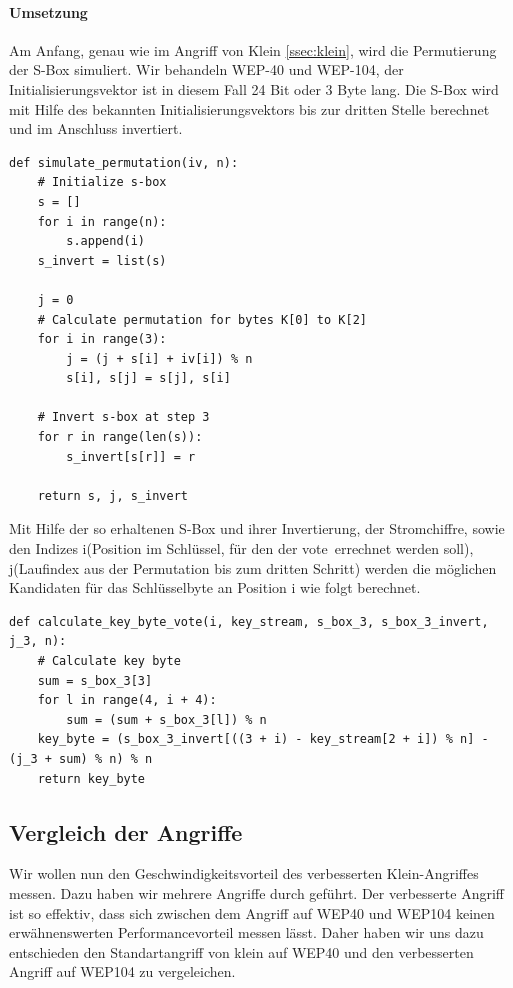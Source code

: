 \documentclass[10pt,a4paper]{article}
\begin{document}
\paragraph{Umsetzung}
Am Anfang, genau wie im Angriff von Klein \ref{ssec:klein}, wird die Permutierung der S-Box simuliert. Wir behandeln WEP-40 und WEP-104, der Initialisierungsvektor ist in diesem Fall 24 Bit oder 3 Byte lang. Die S-Box wird mit Hilfe des bekannten Initialisierungsvektors bis zur dritten Stelle berechnet und im Anschluss invertiert.
\begin{lstlisting}
def simulate_permutation(iv, n):
    # Initialize s-box
    s = []
    for i in range(n):
        s.append(i)
    s_invert = list(s)

    j = 0
    # Calculate permutation for bytes K[0] to K[2]
    for i in range(3):
        j = (j + s[i] + iv[i]) % n
        s[i], s[j] = s[j], s[i]

    # Invert s-box at step 3
    for r in range(len(s)):
        s_invert[s[r]] = r

    return s, j, s_invert
\end{lstlisting}
Mit Hilfe der so erhaltenen S-Box und ihrer Invertierung, der Stromchiffre, sowie den Indizes i(Position im Schlüssel, für den der \glqq vote\grqq\ errechnet werden soll), j(Laufindex aus der Permutation bis zum dritten Schritt) werden die möglichen Kandidaten für das Schlüsselbyte an Position i wie folgt berechnet.
\begin{lstlisting}
def calculate_key_byte_vote(i, key_stream, s_box_3, s_box_3_invert, j_3, n):
    # Calculate key byte
    sum = s_box_3[3]
    for l in range(4, i + 4):
        sum = (sum + s_box_3[l]) % n
    key_byte = (s_box_3_invert[((3 + i) - key_stream[2 + i]) % n] - (j_3 + sum) % n) % n
    return key_byte
\end{lstlisting}

\subsection{Vergleich der Angriffe}

\label{subsec:vergleich}
Wir wollen nun den Geschwindigkeitsvorteil des verbesserten Klein-Angriffes messen. Dazu haben wir mehrere Angriffe durch geführt. Der verbesserte Angriff ist so effektiv, dass sich zwischen dem Angriff auf WEP40 und WEP104 keinen erwähnenswerten Performancevorteil messen lässt. Daher haben wir uns dazu entschieden den Standartangriff von klein auf WEP40 und den verbesserten Angriff auf WEP104 zu vergeleichen.
\end{document}
